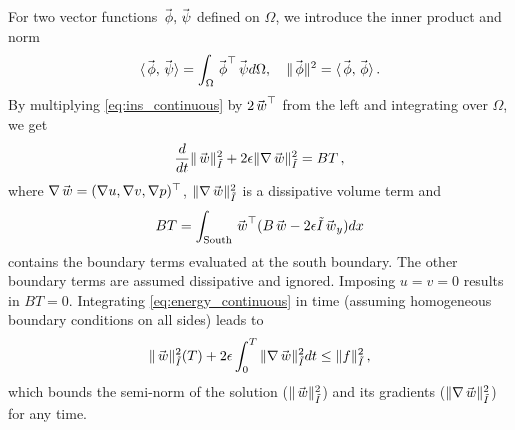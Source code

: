 For two vector functions $\phiv,\psiv$ defined on $\Omega$, we introduce the inner product and norm
\[
  \langle \phiv, \psiv \rangle = \int_\Omega \phiv^\top \psiv d\Omega
  , \quad
  \|\phiv\|^2 = \langle \phiv,\phiv\rangle
  \, .
\]
By multiplying \eqref{eq:ins_continuous} by $2\w^\top$ from the left and integrating over $\Omega$, we get
\begin{equation}
   \frac{d}{dt}\|\w\|^2_{\It} + 2\epsilon \|\nabla \w\|^2_{\It} =  BT
   \, ,
   \label{eq:energy_continuous}
\end{equation}
where $\nabla \w = (\nabla u,\nabla v, \nabla p)^\top$, $\|\nabla \w\|^2_{\It}$ is a dissipative volume term and
\[
  BT = 
  \int_{\text{South}}\w^\top (B \w - 2\epsilon \It \w_y) d x
\]
contains the boundary terms evaluated at the south boundary. The other boundary terms are assumed dissipative and ignored. Imposing $u = v = 0$ results in $BT = 0$. Integrating \eqref{eq:energy_continuous} in time (assuming homogeneous boundary conditions on all sides) leads to 
\begin{equation}
   \|\w\|^2_{\tilde{I}}(T) + 2\epsilon \int_0^T\|\nabla \w\|^2_{\tilde{I}} dt
   \le  \|f\|_{\tilde{I}}^2
   \, ,
   \label{eq:estimate_continuous}
\end{equation}
which bounds the semi-norm of the solution ($\|\w\|^2_{\tilde{I}}$) and its gradients ($\|\nabla \w\|^2_{\tilde{I}}$) for any time.
